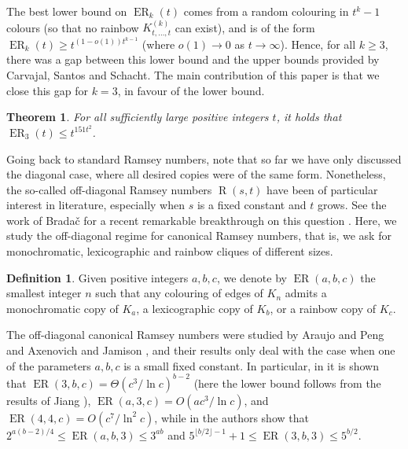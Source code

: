 \documentclass[11pt]{article}
\theoremstyle{plain}
\newtheorem{theorem}{Theorem}[section]
\theoremstyle{definition}
\newtheorem{definition}{Definition}
\newcommand{\erado}[2]{\operatorname{ER}_{#1}(#2)}
\newcommand{\offerado}[3]{\operatorname{ER}(#1,#2,#3)}
\newcommand{\cmpltt}[3]{K^{(#1)}_{#2,\dots,#3}}
\newcommand{\cmplt}[2]{\cmpltt{#1}{#2}{#2}}
\begin{document}
The best lower bound on $\erado{k}{t}$ comes from a random colouring in $t^k-1$ colours (so that no rainbow $\cmplt{k}{t}$ can exist), and is of the form $\erado{k}{t}\ge t^{(1-o(1))t^{k-1}}$ (where $o(1)\to 0$ as $t\to \infty$). Hence, for all $k\geq 3$, there was a gap between this lower bound and the upper bounds provided by Carvajal, Santos and Schacht. The main contribution of this paper is that we close this gap for $k=3$, in favour of the lower bound.

\begin{theorem}\label{thm-tri-erado}
    For all sufficiently large positive integers $t$, it holds that $\erado{3}{t}\le t^{151t^2}$.
\end{theorem}

\bigskip

Going back to standard Ramsey numbers, note that so far we have only discussed the diagonal case, where all desired copies were of the same form. Nonetheless, the so-called off-diagonal Ramsey numbers $\operatorname{R}(s,t)$ have been of particular interest in literature, especially when $s$ is a fixed constant and $t$ grows. See the work of Brada\v{c} for a recent remarkable breakthrough on this question \cite{bradac2026off}. Here, we study the off-diagonal regime for canonical Ramsey numbers, that is, we ask for monochromatic, lexicographic and rainbow cliques of different sizes.

\begin{definition}\label{def-offerado}
    Given positive integers $a,b,c$, we denote by $\offerado{a}{b}{c}$ the smallest integer $n$ such that any colouring of edges of $K_n$ admits a monochromatic copy of $K_a$, a lexicographic copy of $K_b$, or a rainbow copy of $K_c$.
\end{definition}

The off-diagonal canonical Ramsey numbers were studied by Araujo and Peng \cite{araujo2024off} and Axenovich and Jamison \cite{axenovich2005canonical}, and their results only deal with the case when one of the parameters $a,b,c$ is a small fixed constant. In particular, in \cite{araujo2024off} it is shown that $\offerado{3}{b}{c}=\Theta(c^3/\ln c)^{b-2}$ (here the lower bound follows from the results of Jiang \cite{jiang2009canonical}), $\offerado{a}{3}{c}= O(ac^3/\ln c)$, and $\offerado{4}{4}{c}= O(c^7/\ln^2 c)$, while in \cite{axenovich2005canonical} the authors show that $2^{a(b-2)/4}\le \offerado{a}{b}{3}\le 3^{ab}$ and $5^{\lfloor b/2\rfloor-1}+1\le \offerado{3}{b}{3}\le 5^{b/2}$.
\end{document}
